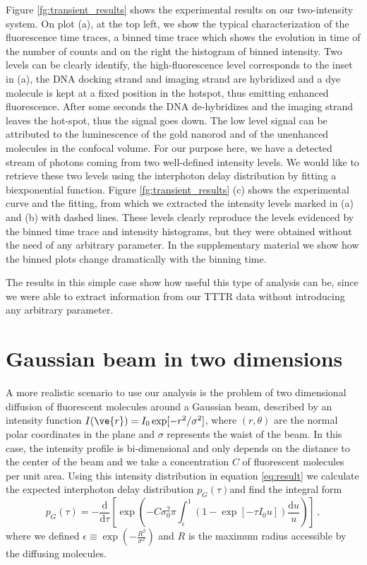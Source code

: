 Figure \ref{fg:transient_results} shows the experimental results
 on our two-intensity system. On plot (a), at the top left, we 
show the typical characterization of the fluorescence time traces, 
a binned time trace which shows the evolution in time of the 
number of counts and on the right the histogram of binned 
intensity. Two levels can be clearly identify, the high-fluorescence 
level corresponds to the inset in (a), the DNA docking strand and 
imaging strand are hybridized and a dye molecule is kept at a fixed 
position in the hotspot, thus emitting enhanced fluorescence. After 
some seconds the DNA de-hybridizes and the imaging strand leaves the 
hot-spot, thus the signal goes down. 
The low level signal can be attributed to the luminescence of the 
gold nanorod and of the unenhanced molecules in the confocal volume. 
For our purpose here, we have a detected stream of photons coming 
from two well-defined intensity levels. 
We would like to retrieve these two levels using the interphoton 
delay distribution by fitting a biexponential function. 
Figure \ref{fg:transient_results} (c) shows the experimental curve 
and the fitting, from which we extracted the intensity levels 
marked in (a) and (b) with dashed lines. These levels clearly 
reproduce the levels evidenced by the binned time trace and intensity 
histograms, but they were obtained without the need of any arbitrary 
parameter. In the supplementary material we show how the binned plots 
change dramatically with the binning time. 

The results in this simple case show how useful this type of analysis 
can be, since we were able to extract information from our TTTR data 
without introducing any arbitrary parameter.

\section{Gaussian beam in two dimensions\label{sec:gaussian2d}}

A more realistic scenario to use our analysis is the problem of two 
dimensional diffusion of fluorescent molecules around a Gaussian beam, 
described by an intensity function $I(\ve{r}) = I_0 \exp[-r^2/\sigma^2]$, 
where $(r,\theta)$ are the normal polar coordinates in the plane and 
$\sigma$ represents the waist of the beam. 
In this case, the intensity profile is bi-dimensional and only depends
on the distance to the center of the beam and we take a concentration 
$C$ of fluorescent molecules per unit area. Using this intensity 
distribution in equation \ref{eq:result} we calculate the expected 
interphoton delay distribution $p_G(\tau)$and find the integral form
\begin{equation}
p_{G}(\tau)=-\frac{\mbox{d}}{\mbox{d}\tau}\left[ \exp\left(-C \sigma_0^2 \pi \int_{\epsilon}^1\left(1-\exp\left[-\tau I_0 u \right]\right) \frac{\mbox{d}u}{u}\right)    \right]\,,  
\label{eq:gaussian2d}
\end{equation}
where we defined $\epsilon \equiv \exp\left(-\frac{R^2}{\sigma^2}\right)$ 
and $R$ is the maximum radius accessible by the diffusing molecules.

